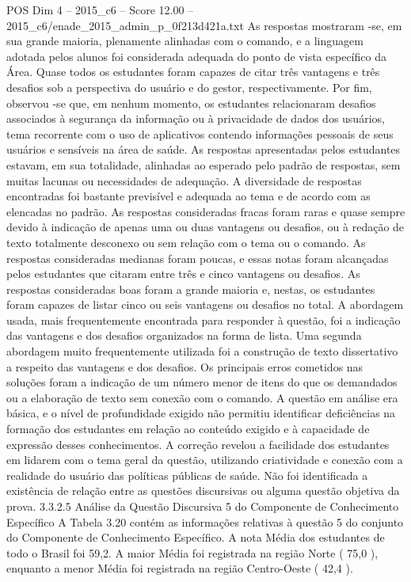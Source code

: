 \begin{textsample}{POS Dim 4 – 2015\_c6 – Score 12.00 – 2015\_c6/enade\_2015\_admin\_p\_0f213d421a.txt}
As respostas mostraram -se, em sua grande maioria, plenamente alinhadas com o comando, e a linguagem adotada pelos alunos foi considerada adequada do ponto de vista específico da Área.
Quase todos os estudantes foram capazes de citar três vantagens e três desafios sob a perspectiva do usuário e do gestor, respectivamente.
Por fim, observou -se que, em nenhum momento, os estudantes relacionaram desafios associados à segurança da informação ou à privacidade de dados dos usuários, tema recorrente com o uso de aplicativos contendo informações pessoais de seus usuários e sensíveis na área de saúde.
As respostas apresentadas pelos estudantes estavam, em sua totalidade, alinhadas ao esperado pelo padrão de respostas, sem muitas lacunas ou necessidades de adequação.
A diversidade de respostas encontradas foi bastante previsível e adequada ao tema e de acordo com as elencadas no padrão.
As respostas consideradas fracas foram raras e quase sempre devido à indicação de apenas uma ou duas vantagens ou desafios, ou à redação de texto totalmente desconexo ou sem relação com o tema ou o comando.
As respostas consideradas medianas foram poucas, e essas notas foram alcançadas pelos estudantes que citaram entre três e cinco vantagens ou desafios.
As respostas consideradas boas foram a grande maioria e, nestas, os estudantes foram capazes de listar cinco ou seis vantagens ou desafios no total.
A abordagem usada, mais frequentemente encontrada para responder à questão, foi a indicação das vantagens e dos desafios organizados na forma de lista.
Uma segunda abordagem muito frequentemente utilizada foi a construção de texto dissertativo a respeito das vantagens e dos desafios.
Os principais erros cometidos nas soluções foram a indicação de um número menor de itens do que os demandados ou a elaboração de texto sem conexão com o comando.
A questão em análise era básica, e o nível de profundidade exigido não permitiu identificar deficiências na formação dos estudantes em relação ao conteúdo exigido e à capacidade de expressão desses conhecimentos.
A correção revelou a facilidade dos estudantes em lidarem com o tema geral da questão, utilizando criatividade e conexão com a realidade do usuário das políticas públicas de saúde.
Não foi identificada a existência de relação entre as questões discursivas ou alguma questão objetiva da prova. 3.3.2.5 Análise da Questão Discursiva 5 do Componente de Conhecimento Específico A Tabela 3.20 contém as informações relativas à questão 5 do conjunto do Componente de Conhecimento Específico.
A nota Média dos estudantes de todo o Brasil foi 59,2.
A maior Média foi registrada na região Norte ( 75,0 ), enquanto a menor Média foi registrada na região Centro-Oeste ( 42,4 ).

\end{textsample}
